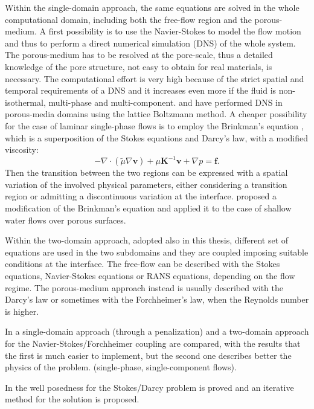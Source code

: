 Within the single-domain approach, the same equations are solved in the whole 
computational domain, including both the free-flow region and the 
porous-medium. A first possibility is to use the Navier-Stokes to model the 
flow motion and thus to perform a direct numerical simulation (DNS) of the 
whole system. The porous-medium has to be resolved at the pore-scale, thus a 
detailed knowledge of the pore structure, not easy to obtain for real 
materials, is necessary. The computational effort is very high because 
of the strict spatial and temporal requirements of a DNS and it increases even 
more if the fluid is non-isothermal, multi-phase and multi-component. 
\textcite{intro:dns} and \textcite{intro:dns2} have performed DNS in 
porous-media domains using the lattice Boltzmann method. A cheaper possibility 
for the case of laminar single-phase flows is to employ the Brinkman's equation 
\cite{intro:brinkman}, which is a superposition of the Stokes equations and 
Darcy's law, with a modified viscosity:
\begin{equation}
	-\nabla \cdot (\tilde{\mu} \nabla \mathbf{v}) + \mu 
	\mathbf{K}^{-1}\mathbf{v} + \nabla p = \mathbf{f}.
\end{equation}
Then the transition between the two 
regions can be expressed with a spatial variation of the involved physical 
parameters, either considering a transition region or admitting a discontinuous 
variation at the interface. \textcite{intro:shavit} proposed a modification of 
the Brinkman's equation and applied it to the case of shallow water flows over 
porous surfaces.

Within the two-domain approach, adopted also in this thesis, different set of 
equations are used in the two subdomains and they are coupled imposing suitable 
conditions at the interface.
The free-flow can be described with the Stokes 
equations, Navier-Stokes equations or RANS equations, depending on the flow 
regime. The porous-medium approach instead is usually described with the 
Darcy's law or sometimes with the Forchheimer's law, when the Reynolds number 
is higher.

In \cite{intro:disca2} a single-domain approach (through a penalization) and a 
two-domain approach for 
the Navier-Stokes/Forchheimer coupling are compared, with the results that the 
first is much easier to implement, but the second one describes better the 
physics of the problem. (single-phase, single-component flows).

In \cite{intro:disca} the well posedness for the Stokes/Darcy problem is proved 
and an iterative method for the solution is proposed.

